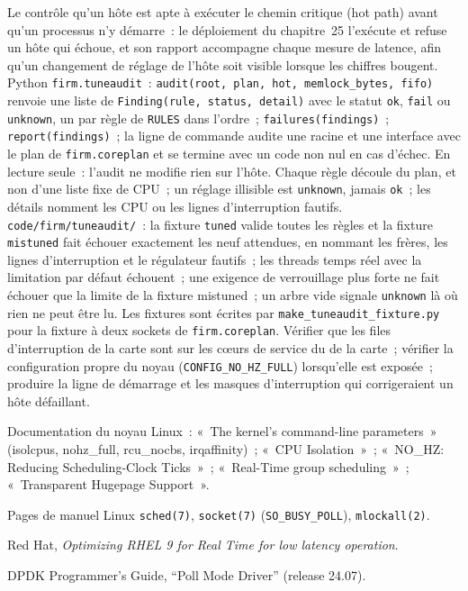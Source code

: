 \begin{build}
 Le contrôle qu'un hôte est apte à exécuter le chemin critique (hot path) avant qu'un processus n'y démarre~: le déploiement du chapitre~25
l'exécute et refuse un hôte qui échoue, et son rapport accompagne chaque mesure de latence, afin qu'un changement de réglage de l'hôte soit
visible lorsque les chiffres bougent.
 Python \texttt{firm.tuneaudit}~: \texttt{audit(root, plan, hot, memlock\_bytes, fifo)} renvoie une liste de
\texttt{Finding(rule, status, detail)} avec le statut \texttt{ok}, \texttt{fail} ou \texttt{unknown}, un par règle de
\texttt{RULES} dans l'ordre~; \texttt{failures(findings)}~; \texttt{report(findings)}~; la ligne de commande audite une racine et une interface
avec le plan de \texttt{firm.coreplan} et se termine avec un code non nul en cas d'échec.
 En lecture seule~: l'audit ne modifie rien sur l'hôte. Chaque règle découle du plan, et non d'une liste fixe de CPU~;
un réglage illisible est \texttt{unknown}, jamais \texttt{ok}~; les détails nomment les CPU ou les lignes d'interruption fautifs.
 \texttt{code/firm/tuneaudit/}~: la fixture \texttt{tuned} valide toutes les règles et la
fixture \texttt{mistuned} fait échouer exactement les neuf attendues, en nommant les frères, les lignes d'interruption et le régulateur fautifs~;
les threads temps réel avec la limitation par défaut échouent~; une exigence de verrouillage plus forte ne fait échouer que la limite de la fixture mistuned~; un arbre vide signale
\texttt{unknown} là où rien ne peut être lu. Les fixtures sont écrites par \texttt{make\_tuneaudit\_fixture.py} pour
la fixture à deux sockets de \texttt{firm.coreplan}.
 Vérifier que les files d'interruption de la carte sont sur les cœurs de service du  de la carte~; vérifier la configuration propre du noyau
(\texttt{CONFIG\_NO\_HZ\_FULL}) lorsqu'elle est exposée~; produire la ligne de démarrage et les masques d'interruption qui corrigeraient un
hôte défaillant.
\end{build}

\begin{omsources}
\item Documentation du noyau Linux~: «~The kernel's command-line parameters~» (isolcpus, nohz\_full, rcu\_nocbs,
irqaffinity)~; «~CPU Isolation~»~; «~NO\_HZ: Reducing Scheduling-Clock Ticks~»~; «~Real-Time group scheduling~»~;
«~Transparent Hugepage Support~».
\item Pages de manuel Linux \texttt{sched(7)}, \texttt{socket(7)} (\texttt{SO\_BUSY\_POLL}), \texttt{mlockall(2)}.
\item Red Hat, \emph{Optimizing RHEL 9 for Real Time for low latency operation}.
\item DPDK Programmer's Guide, ``Poll Mode Driver'' (release 24.07).
\end{omsources}

